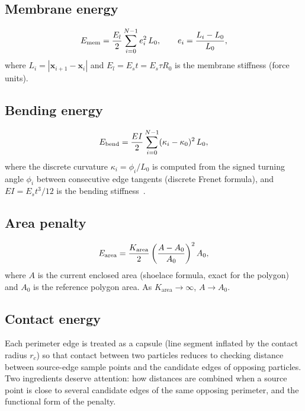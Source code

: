 \documentclass[aps,pre,twocolumn,floatfix,longbibliography]{revtex4-2}
\newcommand{\El}{E_l}
\newcommand{\Karea}{K_{\mathrm{area}}}
\begin{document}
\subsection{Membrane energy}

\begin{equation}
  E_{\rm mem} = \frac{\El}{2} \sum_{i=0}^{N-1} e_i^2\, L_0,
  \qquad e_i = \frac{L_i - L_0}{L_0},
\label{eq:Emem}
\end{equation}
where $L_i = |\mathbf{x}_{i+1} - \mathbf{x}_i|$ and $\El = E_s t = E_s \tau R_0$
is the membrane stiffness (force units).

\subsection{Bending energy}

\begin{equation}
  E_{\rm bend} = \frac{EI}{2}\sum_{i=0}^{N-1} (\kappa_i - \kappa_0)^2\, L_0,
\label{eq:Ebend}
\end{equation}
where the discrete curvature $\kappa_i = \phi_i/L_0$ is computed from the signed
turning angle $\phi_i$ between consecutive edge tangents (discrete Frenet formula),
and $EI = E_s t^3/12$ is the bending stiffness~\cite{Landau1986}.

\subsection{Area penalty}

\begin{equation}
  E_{\rm area} = \frac{\Karea}{2}\left(\frac{A - A_0}{A_0}\right)^2 A_0,
\label{eq:Earea}
\end{equation}
where $A$ is the current enclosed area (shoelace formula, exact for the polygon)
and $A_0$ is the reference polygon area.  As $\Karea \to \infty$, $A \to A_0$.

\subsection{Contact energy}
\label{sec:contact}

Each perimeter edge is treated as a capsule (line segment inflated by the
contact radius $r_c$) so that contact between two particles reduces to
checking distance between source-edge sample points and the candidate edges
of opposing particles.  Two ingredients deserve attention: how distances are
combined when a source point is close to several candidate edges of the same
opposing perimeter, and the functional form of the penalty.
\end{document}
